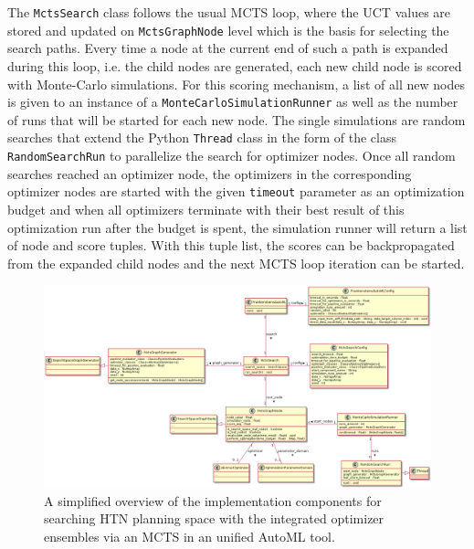 The \texttt{MctsSearch} class follows the usual MCTS loop, where the UCT values are stored and updated on \texttt{MctsGraphNode} level which is the basis for selecting the search paths.
Every time a node at the current end of such a path is expanded during this loop, i.e. the child nodes are generated, each new child node is scored with Monte-Carlo simulations.\newline
For this scoring mechanism, a list of all new nodes is given to an instance of a \texttt{MonteCarloSimulationRunner} as well as the number of runs that will be started for each new node.
The single simulations are random searches that extend the Python \texttt{Thread} class in the form of the class \texttt{RandomSearchRun} to parallelize the search for optimizer nodes.
Once all random searches reached an optimizer node, the optimizers in the corresponding optimizer nodes are started with the given \texttt{timeout} parameter as an optimization budget and when all optimizers terminate with their best result of this optimization run after the budget is spent, the simulation runner will return a list of node and score tuples.
With this tuple list, the scores can be backpropagated from the expanded child nodes and the next MCTS loop iteration can be started.

\begin{figure}[ht!]
    \centering
    \includegraphics[angle=90,origin=c,width=\textwidth,height=0.7\textheight,keepaspectratio]{gfx/Figures/Implementation/mcts/MctsAutoML.png}
    \caption{A simplified overview of the implementation components for searching HTN planning space with the integrated optimizer ensembles via an MCTS in an unified AutoML tool.}
    \label{fig:implementation:uml:mcts}
\end{figure}


